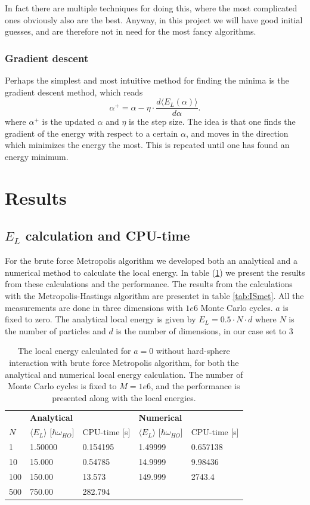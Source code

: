 \documentclass[norsk,a4paper,12pt]{article}
\begin{document}
In fact there are multiple techniques for doing this, where the most complicated ones obviously also are the best. Anyway, in this project we will have good initial guesses, and are therefore not in need for the most fancy algorithms. 

\subsubsection{Gradient descent}
Perhaps the simplest and most intuitive method for finding the minima is the gradient descent method, which reads
\begin{equation}
\alpha^+=\alpha - \eta\cdot\frac{d\langle E_L(\alpha)\rangle}{d\alpha}.
\end{equation}
where $\alpha^+$ is the updated $\alpha$ and $\eta$ is the step size. The idea is that one finds the gradient of the energy with respect to a certain $\alpha$, and moves in the direction which minimizes the energy the most. This is repeated until one has found an energy minimum. 

\section{Results}
\subsection{$E_L$ calculation and CPU-time}\label{CPU}
For the brute force Metropolis algorithm we developed both an analytical and a numerical method to calculate the local energy. In table (\ref{tab:BFmet}) we present the results from these calculations and the performance. The results from the calculations with the Metropolis-Hastings algorithm are presentet in table \ref{tab:ISmet}. All the measurements are done in three dimensions with $1e6$ Monte Carlo cycles. $a$ is fixed to zero. The analytical local energy is given by $E_L=0.5\cdot N\cdot d$ where $N$ is the number of particles and $d$ is the number of dimensions, in our case set to 3

\begin{table} [H]
\centering
\caption{The local energy calculated for $a=0$  without hard-sphere interaction with brute force Metropolis algorithm, for both the analytical and numerical local energy calculation. The number of Monte Carlo cycles is fixed to $M=1e6$, and the performance is presented along with the local energies. }
\begin{tabularx}{\textwidth}{X|XX|XX} \hline
\label{tab:BFmet}
& \multicolumn{2}{X}{\textbf{Analytical}} & \multicolumn{2}{X}{\textbf{Numerical}} \\
$N$ & $\langle E_L\rangle$ [$\hbar\omega_{HO}$] & CPU-time [s] & $\langle E_L\rangle$ [$\hbar\omega_{HO}$] & CPU-time [s]\\ \hline
1 & 1.50000 & 0.154195 & 1.49999 & 0.657138 \\
10 & 15.000 & 0.54785 & 14.9999 & 9.98436 \\
100 & 150.00 & 13.573 & 149.999 & 2743.4\\
500 & 750.00 & 282.794 & & \\ \hline
\end{tabularx}
\end{table}
\end{document}
